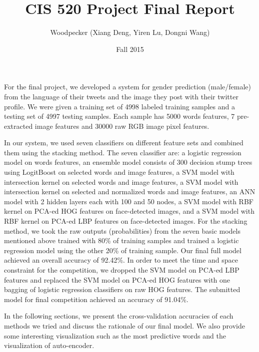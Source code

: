 \documentclass[english]{article}
\title{CIS 520 Project Final Report}
\author{Woodpecker (Xiang Deng, Yiren Lu, Dongni Wang)}
\date{Fall 2015}
\begin{document}
\maketitle
For the final project, we developed a system for gender prediction (male/female) from the language of their tweets and the image they post with their twitter profile. We were given a training set of 4998 labeled training samples and a testing set of 4997 testing samples. Each sample has 5000 words features, 7 pre-extracted image features and 30000 raw RGB image pixel features.\par
In our system, we used seven classifiers on different feature sets and combined them using the stacking method.
The seven classifier are: a logistic regression model on words features, an ensemble model consists of 300 decision stump trees using LogitBoost on selected words and image features, a SVM model with intersection kernel on selected words and image features, a SVM model with intersection kernel on selected and normalized words and image features, an ANN model with 2 hidden layers each with 100 and 50 nodes, a SVM model with RBF kernel on PCA-ed HOG features on face-detected images, and a SVM model with RBF kernel on PCA-ed LBP features on face-detected images. For the stacking method, we took the raw outputs (probabilities) from the seven basic models mentioned above trained with 80\% of training samples and trained a logistic regression model using the other 20\% of training sample. Our final full model achieved an overall accuracy of 92.42\%. In order to meet the time and space constraint for the competition, we dropped the SVM model on PCA-ed LBP features and replaced the SVM model on PCA-ed HOG features with one bagging of logistic regression classifiers on raw HOG features. The submitted model for final competition achieved an accuracy of 91.04\%. \par
In the following sections, we present the cross-validation accuracies of each methods we tried and discuss the rationale of our final model. We also provide some interesting visualization such as the most predictive words and the visualization of auto-encoder.  






\end{document}
